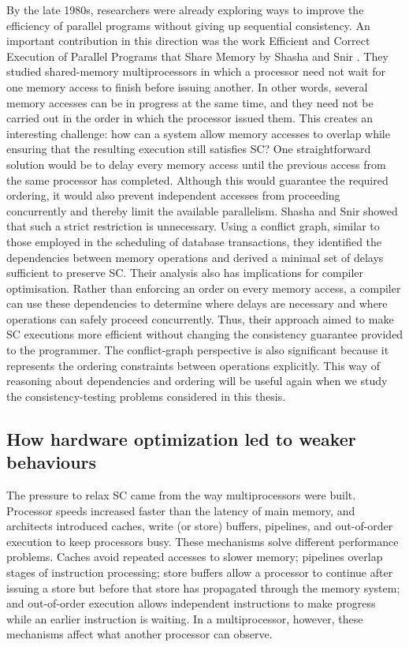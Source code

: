 By the late 1980s, researchers were already exploring ways to improve the efficiency of parallel programs without giving up sequential consistency. An important contribution in this direction was the work Efficient and Correct Execution of Parallel Programs that Share Memory by Shasha and Snir \cite{10.1145/42190.42277}. They studied shared-memory multiprocessors in which a processor need not wait for one memory access to finish before issuing another. In other words, several memory accesses can be in progress at the same time, and they need not be carried out in the order in which the processor issued them. This creates an interesting challenge: how can a system allow memory accesses to overlap while ensuring that the resulting execution still satisfies SC? One straightforward solution would be to delay every memory access until the previous access from the same processor has completed. Although this would guarantee the required ordering, it would also prevent independent accesses from proceeding concurrently and thereby limit the available parallelism. Shasha and Snir showed that such a strict restriction is unnecessary. Using a conflict graph, similar to those employed in the scheduling of database transactions, they identified the dependencies between memory operations and derived a minimal set of delays sufficient to preserve SC. Their analysis also has implications for compiler optimisation. Rather than enforcing an order on every memory access, a compiler can use these dependencies to determine where delays are necessary and where operations can safely proceed concurrently. Thus, their approach aimed to make SC executions more efficient without changing the consistency guarantee provided to the programmer. The conflict-graph perspective is also significant because it represents the ordering constraints between operations explicitly. This way of reasoning about dependencies and ordering will be useful again when we study the consistency-testing problems considered in this thesis.

\subsection{How hardware optimization led to weaker behaviours}

The pressure to relax SC came from the way multiprocessors were built. Processor speeds increased faster than the latency of main memory, and architects introduced caches, write (or store)  buffers, pipelines, and out-of-order execution to keep processors busy. These mechanisms solve different performance problems. Caches avoid repeated accesses to slower memory; pipelines overlap stages of instruction processing; store buffers allow a processor to continue after issuing a store but before that store has propagated through the memory system; and out-of-order execution allows independent instructions to make progress while an earlier instruction is waiting. In a multiprocessor, however, these mechanisms affect what another processor can observe.

